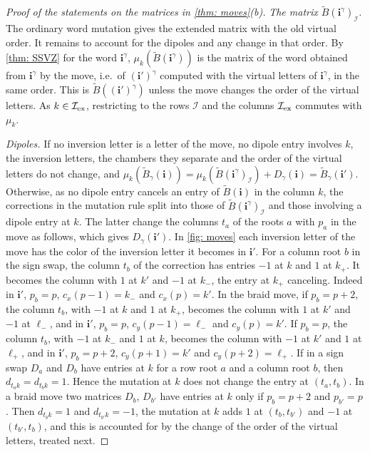 \documentclass[a4paper]{amsart}
\numberwithin{equation}{section}
\theoremstyle{definition}
\theoremstyle{remark}
\newcommand{\mcI}{\mathcal{I}}
\newcommand{\bfi}{\mathbf{i}}
\newcommand{\tB}{\widetilde{B}}
\newcommand{\ex}{{\rm ex}}
\begin{document}
\begin{proof}[Proof of the statements on the matrices in \cref{thm: moves}(b)]
  \emph{The matrix $\tB(\bfi^\gamma)_\mcI$.}
The ordinary word mutation gives the extended matrix with the old virtual order.
It remains to account for the dipoles and any change in that order.
  By \cref{thm: SSVZ} for the word $\bfi^\gamma$, $\mu_k(\tB(\bfi^\gamma))$ is the matrix of the word obtained from $\bfi^\gamma$ by the move, i.e.\ of $(\bfi')^\gamma$ computed with the virtual letters of $\bfi^\gamma$, in the same order.
  This is $\tB((\bfi')^\gamma)$ unless the move changes the order of the virtual letters.
  As $k\in \mcI_\ex$, restricting to the rows $\mcI$ and the columns $\mcI_\ex$ commutes with $\mu_k$.

  \emph{Dipoles.}
  If no inversion letter is a letter of the move, no dipole entry involves $k$, the inversion letters, the chambers they separate and the order of the virtual letters do not change, and $\mu_k(\tB_\gamma(\bfi))=\mu_k(\tB(\bfi^\gamma)_\mcI)+D_\gamma(\bfi)=\tB_\gamma(\bfi')$.
  Otherwise, as no dipole entry cancels an entry of $\tB(\bfi)$ in the column $k$, the corrections in the mutation rule split into those of $\tB(\bfi^\gamma)_\mcI$ and those involving a dipole entry at $k$. The latter change the columns $t_a$ of the roots $a$ with $p_a$ in the move as follows, which gives $D_\gamma(\bfi')$.
  In \cref{fig: moves} each inversion letter of the move has the color of the inversion letter it becomes in $\bfi'$.
  For a column root $b$ in the sign swap, the column $t_b$ of the correction has entries $-1$ at $k$ and $1$ at $k_+$.
  It becomes the column with $1$ at $k'$ and $-1$ at $k_-$, the entry at $k_+$ canceling.
  Indeed in $\bfi'$, $p_b=p$, $c_x(p-1)=k_-$ and $c_x(p)=k'$.
  In the braid move, if $p_b=p+2$, the column $t_b$, with $-1$ at $k$ and $1$ at $k_+$, becomes the column with $1$ at $k'$ and $-1$ at $\ell_-$, and in $\bfi'$, $p_b=p$, $c_y(p-1)=\ell_-$ and $c_y(p)=k'$.
  If $p_b=p$, the column $t_b$, with $-1$ at $k_-$ and $1$ at $k$, becomes the column with $-1$ at $k'$ and $1$ at $\ell_+$, and in $\bfi'$, $p_b=p+2$, $c_y(p+1)=k'$ and $c_y(p+2)=\ell_+$.
  If in a sign swap $D_a$ and $D_b$ have entries at $k$ for a row root $a$ and a column root $b$, then $d_{t_ak}=d_{t_bk}=1$.
  Hence the mutation at $k$ does not change the entry at $(t_a,t_b)$.
  In a braid move two matrices $D_b$, $D_{b'}$ have entries at $k$ only if $p_b=p+2$ and $p_{b'}=p$.
  Then $d_{t_bk}=1$ and $d_{t_{b'}k}=-1$, the mutation at $k$ adds $1$ at $(t_b,t_{b'})$ and $-1$ at $(t_{b'},t_b)$, and this is accounted for by the change of the order of the virtual letters, treated next.


\end{proof}
\end{document}
